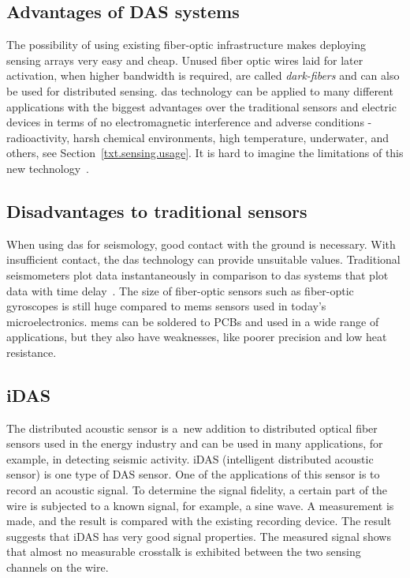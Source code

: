 \subsection{Advantages of DAS systems}

The possibility of using existing fiber-optic infrastructure makes deploying sensing arrays very easy and cheap. Unused fiber optic wires laid for later activation, when higher bandwidth is required, are called \textit{dark-fibers} and can also be used for distributed sensing. \ac{das} technology can be applied to many different applications with the biggest advantages over the traditional sensors and electric devices in terms of no electromagnetic interference and adverse conditions - radioactivity, harsh chemical environments, high temperature, underwater, and others, see Section~\ref{txt.sensing.usage}. It is hard to imagine the limitations of this new technology~\cite{dasKislov}.

\subsection{Disadvantages to traditional sensors}

When using \ac{das} for seismology, good contact with the ground is necessary. With insufficient contact, the \ac{das} technology can provide unsuitable values. Traditional seismometers plot data instantaneously in comparison to \ac{das} systems that plot data with time delay~\cite{dasKislov}. The size of fiber-optic sensors such as fiber-optic gyroscopes is still huge compared to \ac{mems} sensors used in today's microelectronics. \ac{mems} can be soldered to PCBs and used in a wide range of applications, but they also have weaknesses, like poorer precision and low heat resistance. 

\subsection{iDAS}\label{txt.idas}

The distributed acoustic sensor is a~new addition to distributed optical fiber sensors used in the energy industry and can be used in many applications, for example, in detecting seismic activity. iDAS (intelligent distributed acoustic sensor) is one type of DAS sensor. One of the applications of this sensor is to record an acoustic signal. To determine the signal fidelity, a certain part of the wire is subjected to a known signal, for example, a sine wave. A measurement is made, and the result is compared with the existing recording device. The result suggests that iDAS has very good signal properties. The measured signal shows that almost no measurable crosstalk is exhibited between the two sensing channels on the wire.

